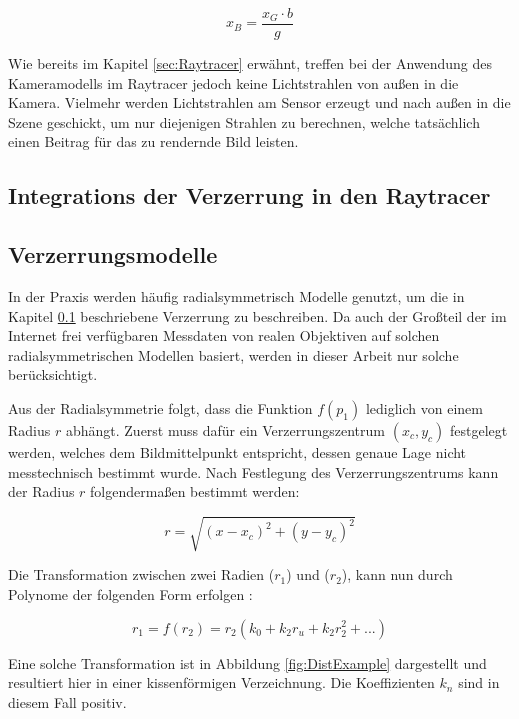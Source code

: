 \begin{equation}
x_B = \frac{x_G \cdot b}{g}
\end{equation}

Wie bereits im Kapitel \ref{sec:Raytracer} erwähnt, treffen bei der Anwendung des Kameramodells im Raytracer jedoch keine Lichtstrahlen von außen in die Kamera. Vielmehr werden Lichtstrahlen am Sensor erzeugt und nach außen in die Szene geschickt, um nur diejenigen Strahlen zu berechnen, welche tatsächlich einen Beitrag für das zu rendernde Bild leisten.

\subsection{Integrations der Verzerrung in den Raytracer}\label{sec:DistortionRaytracer}



\subsection{Verzerrungsmodelle}

In der Praxis werden häufig radialsymmetrisch Modelle genutzt, um die in Kapitel \ref{sec:DistortionRaytracer} beschriebene Verzerrung zu beschreiben. Da auch der Großteil der im Internet frei verfügbaren Messdaten von realen Objektiven auf solchen radialsymmetrischen Modellen basiert, werden in dieser Arbeit nur solche berücksichtigt.

Aus der Radialsymmetrie folgt, dass die Funktion $f(p_1)$ lediglich von einem Radius $r$ abhängt. Zuerst muss dafür ein Verzerrungszentrum $(x_c, y_c)$ festgelegt werden, welches dem Bildmittelpunkt entspricht, dessen genaue Lage nicht messtechnisch bestimmt wurde. Nach Festlegung des Verzerrungszentrums kann der Radius $r$ folgendermaßen bestimmt werden:

\begin{equation}
r = \sqrt{(x- x_c)^2 + (y-y_c)^2}
\end{equation}

Die Transformation zwischen zwei Radien ($r_1$) und ($r_2$), kann nun durch Polynome der folgenden Form erfolgen \cite{TangDistortionModels}:

\begin{equation}
r_1 = f(r_2) = r_2 (k_0 + k_2r_u + k_2r_2^2 + ...)
\label{eq:PolyRadial}
\end{equation}

Eine solche Transformation ist in Abbildung \ref{fig:DistExample} dargestellt und resultiert hier in einer kissenförmigen Verzeichnung. Die Koeffizienten $k_n$ sind in diesem Fall positiv.

